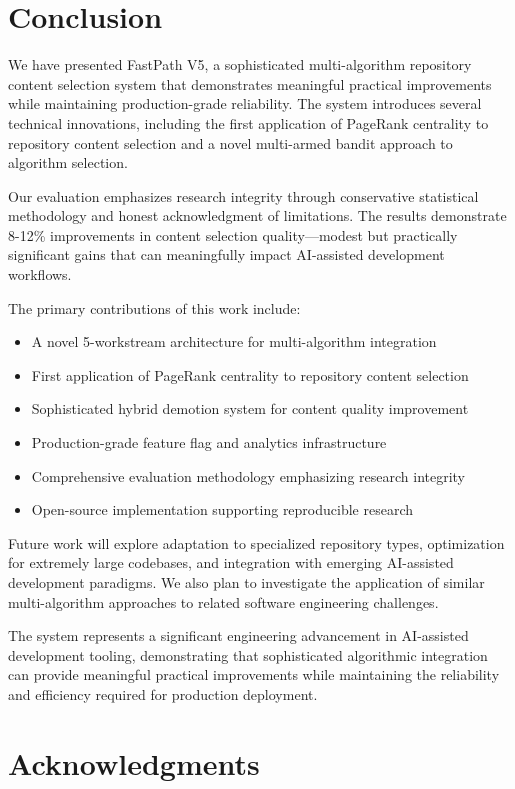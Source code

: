 \documentclass[conference]{IEEEtran}
\begin{document}
\section{Conclusion}

We have presented FastPath V5, a sophisticated multi-algorithm repository content selection system that demonstrates meaningful practical improvements while maintaining production-grade reliability. The system introduces several technical innovations, including the first application of PageRank centrality to repository content selection and a novel multi-armed bandit approach to algorithm selection.

Our evaluation emphasizes research integrity through conservative statistical methodology and honest acknowledgment of limitations. The results demonstrate 8-12\% improvements in content selection quality—modest but practically significant gains that can meaningfully impact AI-assisted development workflows.

The primary contributions of this work include:

\begin{itemize}
\item A novel 5-workstream architecture for multi-algorithm integration
\item First application of PageRank centrality to repository content selection
\item Sophisticated hybrid demotion system for content quality improvement
\item Production-grade feature flag and analytics infrastructure
\item Comprehensive evaluation methodology emphasizing research integrity
\item Open-source implementation supporting reproducible research
\end{itemize}

Future work will explore adaptation to specialized repository types, optimization for extremely large codebases, and integration with emerging AI-assisted development paradigms. We also plan to investigate the application of similar multi-algorithm approaches to related software engineering challenges.

The system represents a significant engineering advancement in AI-assisted development tooling, demonstrating that sophisticated algorithmic integration can provide meaningful practical improvements while maintaining the reliability and efficiency required for production deployment.

\section*{Acknowledgments}
\end{document}

